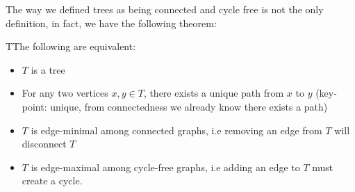 \par\bigskip
\noindent The way we defined trees as being connected and cycle free is not the only definition, in fact, we have the following theorem:
\par\bigskip
\begin{theo}
  TThe following are equivalent:\par
  \begin{itemize}
    \item $T$ is a tree
    \item For any two vertices $x,y\in T$, there exists a unique path from $x$ to $y$ (key-point: unique, from connectedness we already know there exists a path)
    \item $T$ is edge-minimal among connected graphs, i.e removing an edge from $T$ will disconnect $T$
    \item $T$ is edge-maximal among cycle-free graphs, i.e adding an edge to $T$ must create a cycle.
  \end{itemize}
\end{theo}
\newpage
